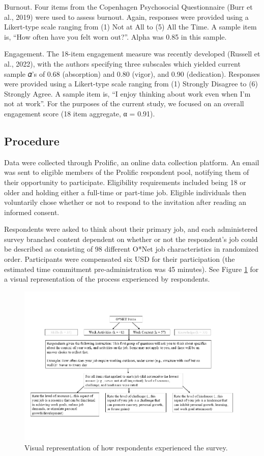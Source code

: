 \documentclass[
  man]{apa7}
\begin{document}
Burnout. Four items from the Copenhagen Psychosocial Questionnaire (Burr et al., 2019) were used to assess burnout. Again, responses were provided using a Likert-type scale ranging from (1) Not at All to (5) All the Time. A sample item is, ``How often have you felt worn out?''. Alpha was 0.85 in this sample.

Engagement. The 18-item engagement measure was recently developed (Russell et al., 2022), with the authors specifying three subscales which yielded current sample 𝛼's of
0.68 (absorption) and 0.80 (vigor), and 0.90 (dedication). Responses were provided using a Likert-type scale ranging from (1) Strongly Disagree to (6) Strongly Agree. A sample item is, ``I enjoy thinking about work even when I'm not at work''. For the purposes of the current study, we focused on an overall engagement score (18 item aggregate, α = 0.91).

\subsection{Procedure}\label{procedure}

Data were collected through Prolific, an online data collection platform. An email was sent to eligible members of the Prolific respondent pool, notifying them of their opportunity to participate. Eligibility requirements included being 18 or older and holding either a full-time or part-time job. Eligible individuals then voluntarily chose whether or not to respond to the invitation after reading an informed consent.

Respondents were asked to think about their primary job, and each administered survey branched content dependent on whether or not the respondent's job could be described as consisting of 98 different O*Net job characteristics in randomized order. Participants were compensated six USD for their participation (the estimated time commitment pre-administration was 45 minutes). See Figure \ref{fig:onetviz} for a visual representation of the process experienced by respondents.

\begin{figure}
\centering
\includegraphics{Submission_files/figure-latex/onetviz-1.pdf}
\caption{\label{fig:onetviz}Visual representation of how respondents experienced the survey.}
\end{figure}
\end{document}
